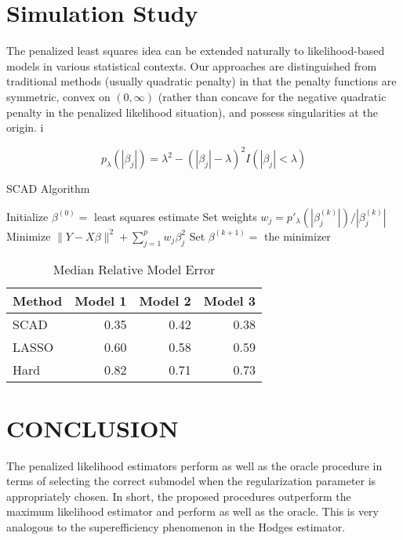 \documentclass[8pt,twocolumn]{article}
\begin{document}
\section{Simulation Study}

The penalized least squares idea can be extended naturally to likelihood-based models in various statistical contexts. Our approaches are distinguished from traditional methods (usually quadratic penalty) in that the penalty functions are symmetric, convex on $(0, \infty)$ (rather than concave for the negative quadratic penalty in the penalized likelihood situation), and possess singularities at the origin.
i




\begin{equation}
  \label{eq:example}
  p_{\lambda}(|\beta_j|) = \lambda^2 - (|\beta_j| - \lambda)^2 I(|\beta_j| < \lambda)
\end{equation}

\begin{algorithm}
  \caption{SCAD Algorithm}
  \label{alg:scad}
  \begin{algorithmic}[1]
    \State Initialize $\beta^{(0)} = $ least squares estimate
      \State Set weights $w_j = p'_{\lambda}(|\beta_j^{(k)}|)/|\beta_j^{(k)}|$
      \State Minimize $\|Y - X\beta\|^2 + \sum_{j=1}^p w_j \beta_j^2$
      \State Set $\beta^{(k+1)} = $ the minimizer
    \EndFor
  \end{algorithmic}
\end{algorithm}

\begin{table}[ht]
  \centering
  \caption{Median Relative Model Error}
  \label{tab:example}
  \begin{tabular}{@{}lrrr@{}}
    \toprule
    Method & Model 1 & Model 2 & Model 3 \\
    \midrule
    SCAD & 0.35 & 0.42 & 0.38 \\
    LASSO & 0.60 & 0.58 & 0.59 \\
    Hard & 0.82 & 0.71 & 0.73 \\
    \bottomrule
  \end{tabular}
\end{table}

\section{CONCLUSION}

The penalized likelihood estimators perform as well as the oracle procedure in terms of selecting the correct submodel when the regularization parameter is appropriately chosen. In short, the proposed procedures outperform the maximum likelihood estimator and perform as well as the oracle. This is very analogous to the superefficiency phenomenon in the Hodges estimator.


\end{document}
